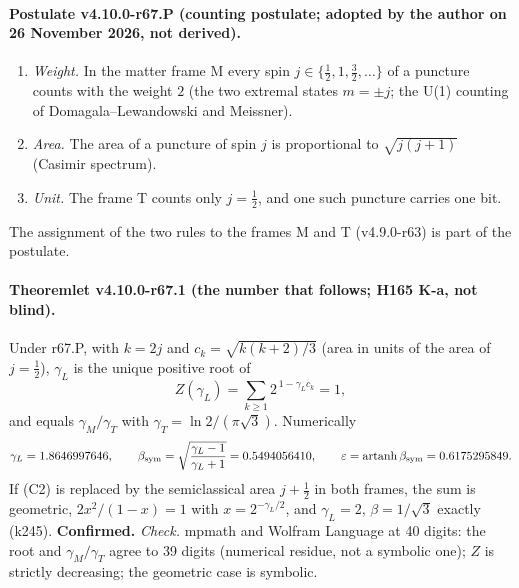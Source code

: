 \paragraph{Postulate v4.10.0-r67.P (counting postulate; adopted by the author on 26 November 2026, not derived).}
\begin{enumerate}[leftmargin=2em]
\item[(C1)] \emph{Weight.}  In the matter frame M every spin \(j\in\{\tfrac12,1,\tfrac32,\dots\}\) of a puncture counts with the weight \(2\) (the two
extremal states \(m=\pm j\); the U(1) counting of Domagala--Lewandowski and Meissner).
\item[(C2)] \emph{Area.}  The area of a puncture of spin \(j\) is proportional to \(\sqrt{j(j+1)}\) (Casimir spectrum).
\item[(C3)] \emph{Unit.}  The frame T counts only \(j=\tfrac12\), and one such puncture carries one bit.
\end{enumerate}
The assignment of the two rules to the frames M and T (v4.9.0-r63) is part of the postulate.

\paragraph{Theoremlet v4.10.0-r67.1 (the number that follows; H165 K-a, not blind).}
Under r67.P, with \(k=2j\) and \(c_k=\sqrt{k(k+2)/3}\) (area in units of the area of \(j=\tfrac12\)), \(\gamma_L\) is the unique positive root of
\[
Z(\gamma_L)=\sum_{k\ge1}2^{\,1-\gamma_L c_k}=1 ,
\]
and equals \(\gamma_M/\gamma_T\) with \(\gamma_T=\ln2/(\pi\sqrt3)\).  Numerically
\[
\gamma_L=1.8646997646,\qquad
\beta_{\rm sym}=\sqrt{\frac{\gamma_L-1}{\gamma_L+1}}=0.5494056410,\qquad
\varepsilon=\operatorname{artanh}\beta_{\rm sym}=0.6175295849 .
\]
If (C2) is replaced by the semiclassical area \(j+\tfrac12\) in both frames, the sum is geometric, \(2x^2/(1-x)=1\) with \(x=2^{-\gamma_L/2}\), and
\(\gamma_L=2\), \(\beta=1/\sqrt3\) exactly (k245).  \textbf{Confirmed.}
\emph{Check.} mpmath and Wolfram Language at 40 digits: the root and \(\gamma_M/\gamma_T\) agree to 39 digits (numerical residue, not a symbolic
one); \(Z\) is strictly decreasing; the geometric case is symbolic.

